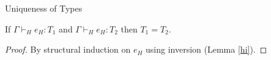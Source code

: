 \begin{huot}
\label{huot}
Uniqueness of Types

If $\Gamma\vdash_{H}e_{H}:T_{1}$ and $\Gamma\vdash_{H}e_{H}:T_{2}$ then $T_{1}=T_{2}$.
\begin{proof}
By structural induction on $e_{H}$ using inversion (Lemma \ref{hi}).
\end{proof}
\end{huot}